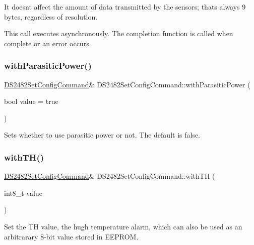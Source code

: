 It doesn\textquotesingle{}t affect the amount of data transmitted by the sensors; that\textquotesingle{}s always 9 bytes, regardless of resolution.

This call executes asynchronously. The completion function is called when complete or an error occurs. \mbox{\label{class_d_s2482_set_config_command_a9c1f96c1cb321f98970df4ef12bd97a7}} 
\subsubsection{\texorpdfstring{with\+Parasitic\+Power()}{withParasiticPower()}}
{\footnotesize\ttfamily \mbox{\hyperlink{class_d_s2482_set_config_command}{D\+S2482\+Set\+Config\+Command}}\& D\+S2482\+Set\+Config\+Command\+::with\+Parasitic\+Power (\begin{DoxyParamCaption}\item[{bool}]{value = {\ttfamily true} }\end{DoxyParamCaption})\hspace{0.3cm}{\ttfamily [inline]}}

Sets whether to use parasitic power or not. The default is false. \mbox{\label{class_d_s2482_set_config_command_aab39af606ba1bf9a00e05129c7bd4fc9}} 
\subsubsection{\texorpdfstring{with\+T\+H()}{withTH()}}
{\footnotesize\ttfamily \mbox{\hyperlink{class_d_s2482_set_config_command}{D\+S2482\+Set\+Config\+Command}}\& D\+S2482\+Set\+Config\+Command\+::with\+TH (\begin{DoxyParamCaption}\item[{int8\+\_\+t}]{value }\end{DoxyParamCaption})\hspace{0.3cm}{\ttfamily [inline]}}

Set the TH value, the hugh temperature alarm, which can also be used as an arbitrarary 8-\/bit value stored in E\+E\+P\+R\+OM. \mbox{\label{class_d_s2482_set_config_command_a90b06127e4a7f88a3f4b4a69546f6e53}} 

